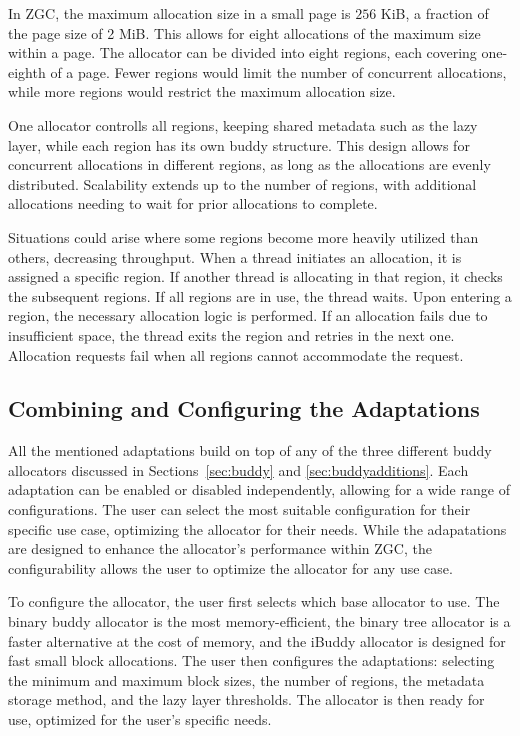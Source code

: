 In ZGC, the maximum allocation size in a small page is $256$ KiB, a fraction of the page size of 2 MiB. This allows for eight allocations of the maximum size within a page. The allocator can be divided into eight regions, each covering one-eighth of a page. Fewer regions would limit the number of concurrent allocations, while more regions would restrict the maximum allocation size.

One allocator controlls all regions, keeping shared metadata such as the lazy layer, while each region has its own buddy structure. This design allows for concurrent allocations in different regions, as long as the allocations are evenly distributed. Scalability extends up to the number of regions, with additional allocations needing to wait for prior allocations to complete.

Situations could arise where some regions become more heavily utilized than others, decreasing throughput. When a thread initiates an allocation, it is assigned a specific region. If another thread is allocating in that region, it checks the subsequent regions. If all regions are in use, the thread waits. Upon entering a region, the necessary allocation logic is performed. If an allocation fails due to insufficient space, the thread exits the region and retries in the next one. Allocation requests fail when all regions cannot accommodate the request.

\newpage
\subsection{Combining and Configuring the Adaptations} \label{sec:adaptationsall}
All the mentioned adaptations build on top of any of the three different buddy allocators discussed in Sections~\ref{sec:buddy} and \ref{sec:buddyadditions}. Each adaptation can be enabled or disabled independently, allowing for a wide range of configurations. The user can select the most suitable configuration for their specific use case, optimizing the allocator for their needs. While the adapatations are designed to enhance the allocator's performance within ZGC, the configurability allows the user to optimize the allocator for any use case.

To configure the allocator, the user first selects which base allocator to use. The binary buddy allocator is the most memory-efficient, the binary tree allocator is a faster alternative at the cost of memory, and the iBuddy allocator is designed for fast small block allocations. The user then configures the adaptations: selecting the minimum and maximum block sizes, the number of regions, the metadata storage method, and the lazy layer thresholds. The allocator is then ready for use, optimized for the user's specific needs.
